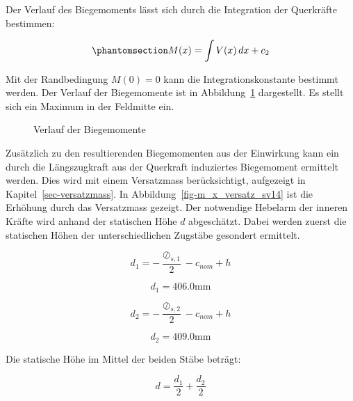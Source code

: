\documentclass[
  12pt,
  letterpaper,
  egregdoesnotlikesansseriftitles]{scrreprt}
\begin{document}
Der Verlauf des Biegemoments lässt sich durch die Integration der
Querkräfte bestimmen:

\begin{equation}\phantomsection\label{eq-m_x_sv14}{
M(x) = \int V(x) \, dx + c_2
}\end{equation}

Mit der Randbedingung \(M(0) = 0\) kann die Integrationskonstante
bestimmt werden. Der Verlauf der Biegemomente ist in
Abbildung~\ref{fig-m_x_sv14} dargestellt. Es stellt sich ein Maximum in
der Feldmitte ein.

\begin{figure}[H]


\caption{\label{fig-m_x_sv14}Verlauf der Biegemomente}

\end{figure}%

Zusätzlich zu den resultierenden Biegemomenten aus der Einwirkung kann
ein durch die Längszugkraft aus der Querkraft induziertes Biegemoment
ermittelt werden. Dies wird mit einem Versatzmass berücksichtigt,
aufgezeigt in Kapitel~\ref{sec-versatzmass}. In
Abbildung~\ref{fig-m_x_versatz_sv14} ist die Erhöhung durch das
Versatzmass gezeigt. Der notwendige Hebelarm der inneren Kräfte wird
anhand der statischen Höhe \(d\) abgeschätzt. Dabei werden zuerst die
statischen Höhen der unterschiedlichen Zugstäbe gesondert ermittelt.

\begin{equation}d_{1} = - \frac{\oslash_{s,1}}{2} - c_{nom} + h\end{equation}

\begin{equation}d_{1} = 406.0 \text{mm}\end{equation}

\begin{equation}d_{2} = - \frac{\oslash_{s,2}}{2} - c_{nom} + h\end{equation}

\begin{equation}d_{2} = 409.0 \text{mm}\end{equation}

Die statische Höhe im Mittel der beiden Stäbe beträgt:

\begin{equation}d = \frac{d_{1}}{2} + \frac{d_{2}}{2}\end{equation}
\end{document}
